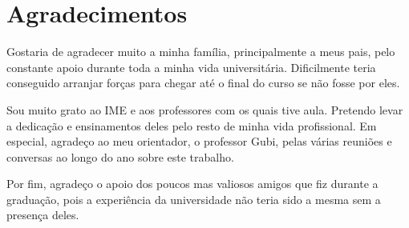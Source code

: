 \chapter*{Agradecimentos}

Gostaria de agradecer muito a minha família, principalmente a meus pais, pelo constante apoio durante toda a minha vida universitária. Dificilmente teria conseguido arranjar forças para chegar até o final do curso se não fosse por eles.

Sou muito grato ao IME e aos professores com os quais tive aula. Pretendo levar a dedicação e ensinamentos deles pelo resto de minha vida profissional. Em especial, agradeço ao meu orientador, o professor Gubi, pelas várias reuniões e conversas ao longo do ano sobre este trabalho.

Por fim, agradeço o apoio dos poucos mas valiosos amigos que fiz durante a graduação, pois a experiência da universidade não teria sido a mesma sem a presença deles.
